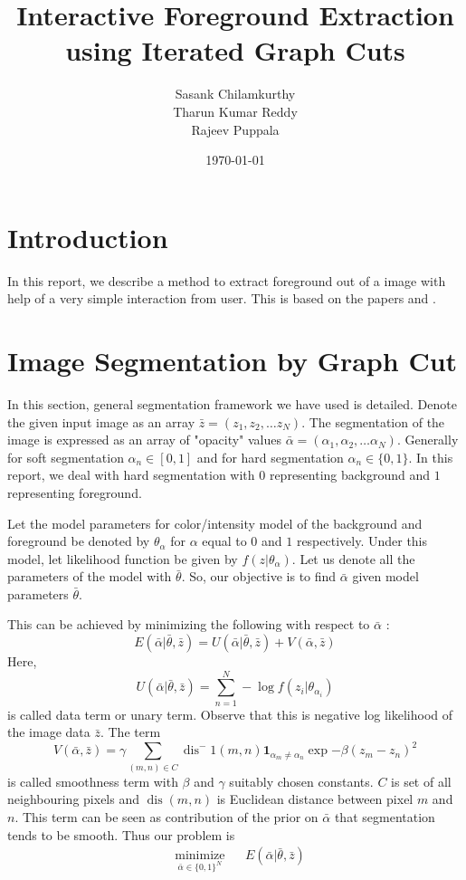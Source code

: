 \documentclass[a4paper]{article}
\begin{document}
\title{Interactive Foreground Extraction using Iterated Graph Cuts}
\author{Sasank Chilamkurthy\\Tharun Kumar Reddy\\Rajeev Puppala}
\date{\today}
\maketitle

\section{Introduction}
In this report, we describe a method to extract foreground out of a image with help of a very simple interaction from user. This is based on the papers \cite{1} and \cite{2}.

\section{Image Segmentation by Graph Cut}
In this section, general segmentation framework we have used is detailed. Denote the given input image as an array $\bar{z} = (z_1, z_2, \dots z_N)$. 
The segmentation of the image is expressed as an array of "opacity" values $\bar{\alpha} = (\alpha_1, \alpha_2, \dots \alpha_N)$. 
Generally for soft segmentation  $\alpha_n \in [0,1]$ and for hard segmentation $\alpha_n \in \{0,1\}$. 
In this report, we deal with hard segmentation with $0$ representing background and $1$ representing foreground.

Let the model parameters for color/intensity model of the background and foreground be denoted by $\theta_\alpha$ for $\alpha$ equal to $0$ and $1$ respectively. 
Under this model, let likelihood function be given by $f(z|\theta_\alpha)$. Let us denote all the parameters of the model with $\bar{\theta}$.
So, our objective is to find $\bar{\alpha}$ given model parameters $\bar{\theta}$.

This can be achieved by minimizing the following with respect to $\bar{\alpha}$ :
\[ 
E(\bar{\alpha}| \bar{\theta},\bar{z} ) = U(\bar{\alpha}| \bar{\theta},\bar{z}) + V(\bar{\alpha},\bar{z})
\]
Here, 
\[
U(\bar{\alpha}| \bar{\theta},\bar{z}) = \sum_{n=1}^N -\log f(z_i | \theta_{\alpha_i})
\] 
is called data term or unary term. Observe that this is negative log likelihood of the image data $\bar{z}$. The term
\[
V(\bar{\alpha},\bar{z}) = \gamma \sum_{(m,n) \in C} \operatorname{dis}^-1(m,n) \mathbf{1}_{\alpha_m \neq \alpha_n} \exp{-\beta(z_m-z_n)^2}
\]
is called smoothness term with $\beta$ and $\gamma$ suitably chosen constants. $C$ is set of all neighbouring pixels and $\operatorname{dis}(m,n)$ is Euclidean distance between pixel $m$ and $n$.  
This term can be seen as contribution of the prior on $\bar{\alpha}$ that segmentation tends to be smooth. Thus our problem is 
\begin{equation}
\begin{aligned}
& \underset{\bar{\alpha}\in\{0,1 \}^N}{\text{minimize}}
& & E(\bar{\alpha}| \bar{\theta},\bar{z} )
\end{aligned}
\end{equation}
\end{document}

